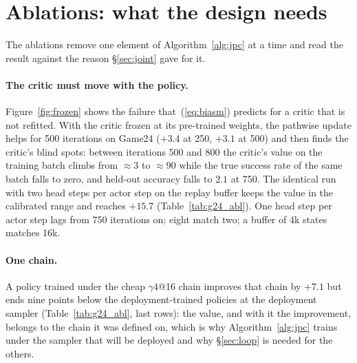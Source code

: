 \section{Ablations: what the design needs}
\label{sec:ablations}
The ablations remove one element of Algorithm~\ref{alg:jpc} at a time and read the result against the reason \S\ref{sec:joint} gave for it.

\paragraph{The critic must move with the policy.}
Figure~\ref{fig:frozen} shows the failure that~(\ref{eq:biasm}) predicts for a critic that is not refitted. With the critic frozen at its pre-trained weights, the pathwise update helps for 500 iterations on Game24 ($+3.4$ at 250, $+3.1$ at 500) and then finds the critic's blind spots: between iterations 500 and 800 the critic's value on the training batch climbs from $\approx3$ to $\approx90$ while the true success rate of the same batch falls to zero, and held-out accuracy falls to $2.1$ at 750. The identical run with two head steps per actor step on the replay buffer keeps the value in the calibrated range and reaches $+15.7$ (Table~\ref{tab:g24_abl}). One head step per actor step lags from 750 iterations on; eight match two; a buffer of 4k states matches 16k.

\paragraph{One chain.}
A policy trained under the cheap $\gamma4$@16 chain improves that chain by $+7.1$ but ends nine points below the deployment-trained policies at the deployment sampler (Table~\ref{tab:g24_abl}, last rows): the value, and with it the improvement, belongs to the chain it was defined on, which is why Algorithm~\ref{alg:jpc} trains under the sampler that will be deployed and why \S\ref{sec:loop} is needed for the others.

